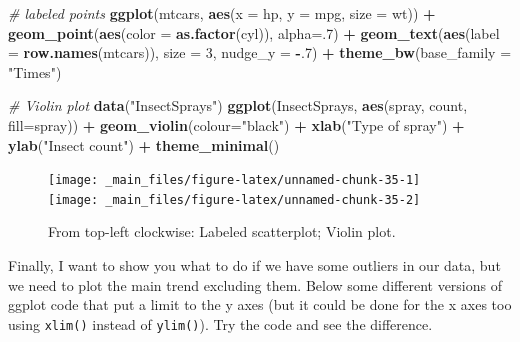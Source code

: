 \documentclass[
]{article}
\newenvironment{Shaded}{\begin{snugshade}}{\end{snugshade}}
\newcommand{\AttributeTok}[1]{\textcolor[rgb]{0.13,0.29,0.53}{#1}}
\newcommand{\CommentTok}[1]{\textcolor[rgb]{0.56,0.35,0.01}{\textit{#1}}}
\newcommand{\DecValTok}[1]{\textcolor[rgb]{0.00,0.00,0.81}{#1}}
\newcommand{\FunctionTok}[1]{\textcolor[rgb]{0.13,0.29,0.53}{\textbf{#1}}}
\newcommand{\NormalTok}[1]{#1}
\newcommand{\SpecialCharTok}[1]{\textcolor[rgb]{0.81,0.36,0.00}{\textbf{#1}}}
\newcommand{\StringTok}[1]{\textcolor[rgb]{0.31,0.60,0.02}{#1}}
\begin{document}
\begin{Shaded}
\begin{Highlighting}[]
\CommentTok{\# labeled points}
\FunctionTok{ggplot}\NormalTok{(mtcars, }\FunctionTok{aes}\NormalTok{(}\AttributeTok{x =}\NormalTok{ hp, }\AttributeTok{y =}\NormalTok{ mpg, }\AttributeTok{size =}\NormalTok{ wt)) }\SpecialCharTok{+}
  \FunctionTok{geom\_point}\NormalTok{(}\FunctionTok{aes}\NormalTok{(}\AttributeTok{color =} \FunctionTok{as.factor}\NormalTok{(cyl)), }\AttributeTok{alpha=}\NormalTok{.}\DecValTok{7}\NormalTok{) }\SpecialCharTok{+}
  \FunctionTok{geom\_text}\NormalTok{(}\FunctionTok{aes}\NormalTok{(}\AttributeTok{label =} \FunctionTok{row.names}\NormalTok{(mtcars)), }\AttributeTok{size =} \DecValTok{3}\NormalTok{, }\AttributeTok{nudge\_y =} \SpecialCharTok{{-}}\NormalTok{.}\DecValTok{7}\NormalTok{) }\SpecialCharTok{+}
  \FunctionTok{theme\_bw}\NormalTok{(}\AttributeTok{base\_family =} \StringTok{"Times"}\NormalTok{)}

\CommentTok{\# Violin plot}
\FunctionTok{data}\NormalTok{(}\StringTok{"InsectSprays"}\NormalTok{)}
\FunctionTok{ggplot}\NormalTok{(InsectSprays, }\FunctionTok{aes}\NormalTok{(spray, count, }\AttributeTok{fill=}\NormalTok{spray)) }\SpecialCharTok{+}
  \FunctionTok{geom\_violin}\NormalTok{(}\AttributeTok{colour=}\StringTok{"black"}\NormalTok{) }\SpecialCharTok{+}
  \FunctionTok{xlab}\NormalTok{(}\StringTok{"Type of spray"}\NormalTok{) }\SpecialCharTok{+}
  \FunctionTok{ylab}\NormalTok{(}\StringTok{"Insect count"}\NormalTok{) }\SpecialCharTok{+}
  \FunctionTok{theme\_minimal}\NormalTok{()}
\end{Highlighting}
\end{Shaded}

\begin{figure}[H]
\texttt{[image: \_main\_files/figure-latex/unnamed-chunk-35-1]} \texttt{[image: \_main\_files/figure-latex/unnamed-chunk-35-2]} \caption{From top-left clockwise: Labeled scatterplot; Violin plot.}\label{fig:unnamed-chunk-35}
\end{figure}

Finally, I want to show you what to do if we have some outliers in our
data, but we need to plot the main trend excluding them. Below some
different versions of ggplot code that put a limit to the y axes (but it
could be done for the x axes too using \texttt{xlim()} instead of \texttt{ylim()}).
Try the code and see the difference.
\end{document}
